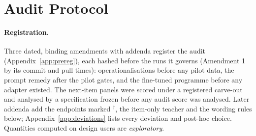 \section{Audit Protocol}
\label{sec:protocol}\label{sec:observation}

\paragraph{Registration.}
Three dated, binding amendments with addenda register the audit (Appendix~\ref{app:prereg}), each hashed before the runs it governs
(Amendment 1 by its commit and pull times): operationalisations before any pilot data, the prompt remedy after the pilot gates, and
the fine-tuned programme before any adapter existed. The next-item panels were scored under a registered carve-out and analysed by a specification frozen before any audit score
was analysed. Later addenda add the endpoints marked $^\dagger$, the item-only teacher and the wording rules below; Appendix~\ref{app:deviations} lists every deviation and post-hoc choice. Quantities computed on design users are
\emph{exploratory}.

